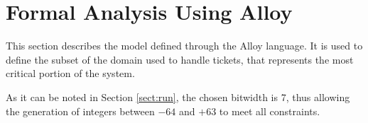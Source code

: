 
\section{Formal Analysis Using Alloy}
\label{sect:alloy}
This section describes the model defined through the Alloy language\textsuperscript{\cite{alloy}}. It is used to define the subset of the domain used to handle tickets, that represents the most critical portion of the system. 

As it can be noted in Section \ref{sect:run}, the chosen bitwidth is 7, thus allowing the generation of integers between $-64$ and $+63$ to meet all constraints.






